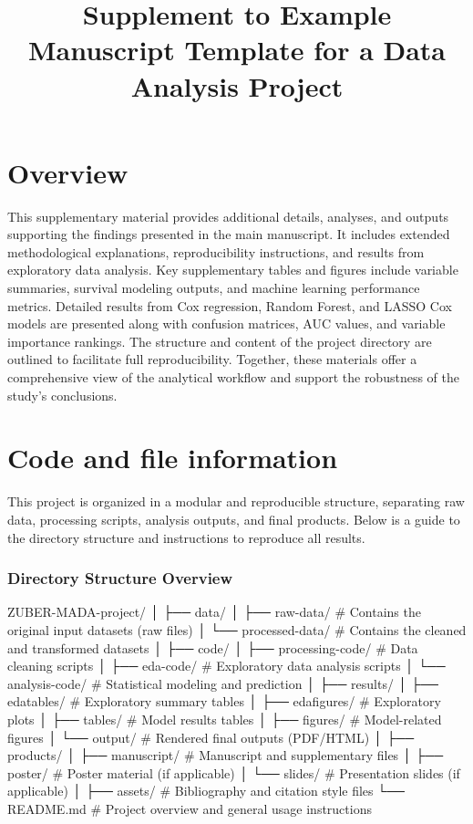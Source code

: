 \documentclass[
  letterpaper,
  DIV=11,
  numbers=noendperiod]{scrartcl}
\title{Supplement to Example Manuscript Template for a Data Analysis
Project}
\author{}
\date{}
\begin{document}
\maketitle


\section{Overview}\label{overview}

This supplementary material provides additional details, analyses, and
outputs supporting the findings presented in the main manuscript. It
includes extended methodological explanations, reproducibility
instructions, and results from exploratory data analysis. Key
supplementary tables and figures include variable summaries, survival
modeling outputs, and machine learning performance metrics. Detailed
results from Cox regression, Random Forest, and LASSO Cox models are
presented along with confusion matrices, AUC values, and variable
importance rankings. The structure and content of the project directory
are outlined to facilitate full reproducibility. Together, these
materials offer a comprehensive view of the analytical workflow and
support the robustness of the study's conclusions.

\section{Code and file information}\label{code-and-file-information}

This project is organized in a modular and reproducible structure,
separating raw data, processing scripts, analysis outputs, and final
products. Below is a guide to the directory structure and instructions
to reproduce all results.

\subsubsection{Directory Structure
Overview}\label{directory-structure-overview}

ZUBER-MADA-project/ │ ├── data/ │ ├── raw-data/ \# Contains the original
input datasets (raw files) │ └── processed-data/ \# Contains the cleaned
and transformed datasets │ ├── code/ │ ├── processing-code/ \# Data
cleaning scripts │ ├── eda-code/ \# Exploratory data analysis scripts │
└── analysis-code/ \# Statistical modeling and prediction │ ├── results/
│ ├── edatables/ \# Exploratory summary tables │ ├── edafigures/ \#
Exploratory plots │ ├── tables/ \# Model results tables │ ├── figures/
\# Model-related figures │ └── output/ \# Rendered final outputs
(PDF/HTML) │ ├── products/ │ ├── manuscript/ \# Manuscript and
supplementary files │ ├── poster/ \# Poster material (if applicable) │
└── slides/ \# Presentation slides (if applicable) │ ├── assets/ \#
Bibliography and citation style files └── README.md \# Project overview
and general usage instructions
\end{document}
